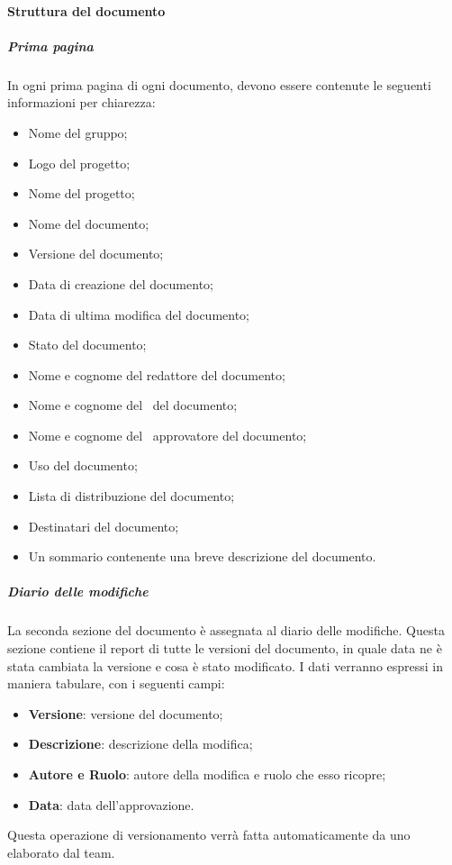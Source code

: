 \documentclass[../NormeDiProgetto_v4.0.0.tex]{subfiles}
\begin{document}
			\paragraph{Struttura del documento}
				\subparagraph{Prima pagina}
				In ogni prima pagina di ogni documento, devono essere contenute le seguenti informazioni per chiarezza:
				\begin{itemize}
				\item Nome del gruppo;
				\item Logo del progetto;
				\item Nome del progetto;
				\item Nome del documento;
				\item Versione del documento;
				\item Data di creazione del documento;
				\item Data di ultima modifica del documento;
				\item Stato del documento;
				\item Nome e cognome del redattore del documento;
				\item Nome e cognome del \verificatore\ del documento;
				\item Nome e cognome del \responsabilediprogetto\ approvatore del documento;
				\item Uso del documento;
				\item Lista di distribuzione del documento;
				\item Destinatari del documento;
				\item Un sommario contenente una breve descrizione del documento.
				\end{itemize}

				\subparagraph{Diario delle modifiche}
				La seconda sezione del documento è assegnata al diario delle modifiche. Questa sezione contiene il report di tutte le versioni del documento, in quale data ne è stata cambiata la versione e cosa è stato modificato. I dati verranno espressi in maniera tabulare, con i seguenti campi:
				\begin{itemize}
				\item \textbf{Versione}: versione del documento;
				\item \textbf{Descrizione}: descrizione della modifica;
				\item \textbf{Autore e Ruolo}: autore della modifica e ruolo che esso ricopre;
				\item \textbf{Data}: data dell'approvazione.
				\end{itemize}
				Questa operazione di versionamento verrà fatta automaticamente da uno   elaborato dal team.
\end{document}
